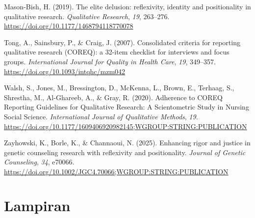 \documentclass[
  indonesian,
  letterpaper,
  DIV=11,
  numbers=noendperiod]{scrreprt}
\newlength{\cslhangindent}
\newenvironment{CSLReferences}[2] %
 {\begin{list}{}{%
  \setlength{\itemindent}{0pt}
  \setlength{\leftmargin}{0pt}
  \setlength{\parsep}{0pt}
  \ifodd #1
   \setlength{\leftmargin}{\cslhangindent}
   \setlength{\itemindent}{-1\cslhangindent}
  \fi
  \setlength{\itemsep}{#2\baselineskip}}}
 {\end{list}}
\begin{document}
\begin{CSLReferences}{1}{0}
Mason-Bish, H. (2019). The elite delusion: reflexivity, identity and
positionality in qualitative research. \emph{Qualitative Research},
\emph{19}, 263--276. \url{https://doi.org/10.1177/1468794118770078}

Tong, A., Sainsbury, P., \& Craig, J. (2007). Consolidated criteria for
reporting qualitative research (COREQ): a 32-item checklist for
interviews and focus groups. \emph{International Journal for Quality in
Health Care}, \emph{19}, 349--357.
\url{https://doi.org/10.1093/intqhc/mzm042}

Walsh, S., Jones, M., Bressington, D., McKenna, L., Brown, E., Terhaag,
S., Shrestha, M., Al-Ghareeb, A., \& Gray, R. (2020). Adherence to COREQ
Reporting Guidelines for Qualitative Research: A Scientometric Study in
Nursing Social Science. \emph{International Journal of Qualitative
Methods}, \emph{19}.
\url{https://doi.org/10.1177/1609406920982145;WGROUP:STRING:PUBLICATION}

Zayhowski, K., Borle, K., \& Channaoui, N. (2025). Enhancing rigor and
justice in genetic counseling research with reflexivity and
positionality. \emph{Journal of Genetic Counseling}, \emph{34}, e70066.
\url{https://doi.org/10.1002/JGC4.70066;WGROUP:STRING:PUBLICATION}

\end{CSLReferences}

\section*{Lampiran}\label{sec-coreq}

\end{document}
